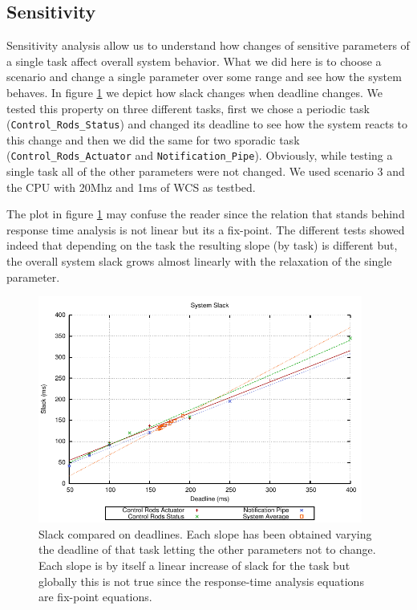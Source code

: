 \documentclass[10pt,a4paper]{report}
\begin{document}
\subsection{Sensitivity}
Sensitivity analysis allow us to understand how changes of sensitive parameters 
of a single task affect overall system behavior. What we did here is to choose 
a scenario and change a single parameter over some range and see how the system
behaves. In figure \ref{fig:senseper} we depict how slack changes when deadline 
changes. We tested this property on three different tasks, first we chose a 
periodic task (\texttt{Control\_Rods\_Status}) and changed its deadline to see 
how the system reacts to this change and then we did the same for two sporadic task
(\texttt{Control\_Rods\_Actuator} and \texttt{Notification\_Pipe}). Obviously, 
while testing a single task all of the other parameters were not changed. We used
scenario 3 and the CPU with 20Mhz and 1ms of WCS as testbed. 

The plot in figure \ref{fig:senseper} may confuse the reader since the relation 
that stands behind response time analysis is not linear but its a fix-point. The 
different tests showed indeed that depending on the task the resulting slope (by 
task) is different but, the overall system slack grows almost linearly with the 
relaxation of the single parameter.

\begin{figure}[tb]
\centering
\includegraphics[width=0.95\textwidth]{plots/sense_slack}
\caption{
    Slack compared on deadlines. Each slope has been obtained varying the 
    deadline of that task letting the other parameters not to change. Each 
    slope is by itself a linear increase of slack for the task but globally 
    this is not true since the response-time analysis equations are 
    fix-point equations. 
}
\label{fig:senseper}
\end{figure}
\end{document}
